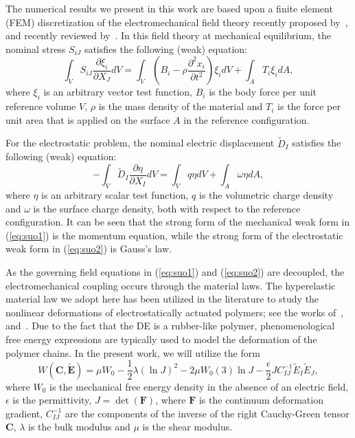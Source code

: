 \documentclass[final,authoryear,3p,times,twocolumn]{elsarticle}
\newcommand{\mbf}{\mathbf}
\begin{document}
The numerical results we present in this work are based upon a finite element (FEM) discretization of the electromechanical field theory recently proposed by~\citet{suoJMPS2008}, and recently reviewed by~\citet{suoAMSS2010}.   In this field theory at mechanical equilibrium, the nominal stress $S_{iJ}$ satisfies the following (weak) equation:
\begin{equation}\label{eq:suo1} \int_{V}S_{iJ}\frac{\partial\xi_{i}}{\partial X_{J}}dV=\int_{V}\left(B_{i}-\rho\frac{\partial^{2}x_{i}}{\partial t^{2}}\right)\xi_{i}dV+\int_{A}T_{i}\xi_{i}dA,
\end{equation}
where $\xi_{i}$ is an arbitrary vector test function, $B_{i}$ is the body force per unit reference volume $V$, $\rho$ is the mass density of the material and $T_{i}$ is the force per unit area that is applied on the surface $A$ in the reference configuration.  

For the electrostatic problem, the nominal electric displacement $\tilde{D}_{I}$ satisfies the following (weak) equation:
\begin{equation}\label{eq:suo2} -\int_{V}\tilde{D}_{I}\frac{\partial\eta}{\partial X_{I}}dV=\int_{V}q\eta dV+\int_{A}\omega\eta dA,
\end{equation}
where $\eta$ is an arbitrary scalar test function, $q$ is the volumetric charge density and $\omega$ is the surface charge density, both with respect to the reference configuration.  It can be seen that the strong form of the mechanical weak form in (\ref{eq:suo1}) is the momentum equation, while the strong form of the electrostatic weak form in (\ref{eq:suo2}) is Gauss's law.  

As the governing field equations in (\ref{eq:suo1}) and (\ref{eq:suo2}) are decoupled, the electromechanical coupling occurs through the material laws.  The hyperelastic material law we adopt here has been utilized in the literature to study the nonlinear deformations of electrostatically actuated polymers; see the works of~\citet{vuIJNME2007}, and~\citet{zhaoAPL2007}.  Due to the fact that the DE is a rubber-like polymer, phenomenological free energy expressions are typically used to model the deformation of the polymer chains.  In the present work, we will utilize the form~\citep{vuIJNME2007,zhaoAPL2007}
\begin{equation}\label{eq:de1} W(\mbf{C},\tilde{\mbf{E}})=\mu W_{0}-\frac{1}{2}\lambda(\ln{J})^{2}-2\mu W_{0}(3)\ln{J}-\frac{\epsilon}{2}JC_{IJ}^{-1}\tilde{E}_{I}\tilde{E}_{J},
\end{equation}
where $W_{0}$ is the mechanical free energy density in the absence of an electric field, $\epsilon$ is the permittivity, $J=\det(\mbf{F})$, where $\mbf{F}$ is the continuum deformation gradient, $C_{IJ}^{-1}$ are the components of the inverse of the right Cauchy-Green tensor $\mbf{C}$, $\lambda$ is the bulk modulus and $\mu$ is the shear modulus.  
\end{document}
